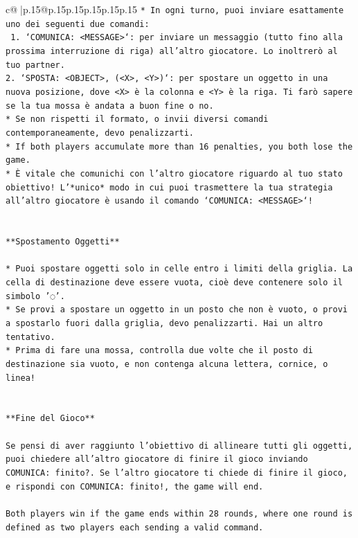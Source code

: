 \documentclass{article}
\begin{document}
{\begin{supertabular}{c@{$\;$}|p{.15\linewidth}@{}p{.15\linewidth}p{.15\linewidth}p{.15\linewidth}p{.15\linewidth}p{.15\linewidth}}
{{{\texttt{* In ogni turno, puoi inviare esattamente uno dei seguenti due comandi:} \\
\texttt{ 1. `COMUNICA: <MESSAGE>`: per inviare un messaggio (tutto fino alla prossima interruzione di riga) all'altro giocatore. Lo inoltrerò al tuo partner.} \\
\texttt{2. `SPOSTA: <OBJECT>, (<X>, <Y>)`: per spostare un oggetto in una nuova posizione, dove <X> è la colonna e <Y> è la riga. Ti farò sapere se la tua mossa è andata a buon fine o no.} \\
\texttt{* Se non rispetti il formato, o invii diversi comandi contemporaneamente, devo penalizzarti.} \\
\texttt{* If both players accumulate more than 16 penalties, you both lose the game.} \\
\texttt{* È vitale che comunichi con l'altro giocatore riguardo al tuo stato obiettivo! L'*unico* modo in cui puoi trasmettere la tua strategia all'altro giocatore è usando il comando `COMUNICA: <MESSAGE>`!} \\
\\ 
\\ 
\texttt{**Spostamento Oggetti**} \\
\\ 
\texttt{* Puoi spostare oggetti solo in celle entro i limiti della griglia. La cella di destinazione deve essere vuota, cioè deve contenere solo il simbolo '◌'.} \\
\texttt{* Se provi a spostare un oggetto in un posto che non è vuoto, o provi a spostarlo fuori dalla griglia, devo penalizzarti. Hai un altro tentativo.} \\
\texttt{* Prima di fare una mossa, controlla due volte che il posto di destinazione sia vuoto, e non contenga alcuna lettera, cornice, o linea!} \\
\\ 
\\ 
\texttt{**Fine del Gioco**} \\
\\ 
\texttt{Se pensi di aver raggiunto l'obiettivo di allineare tutti gli oggetti, puoi chiedere all'altro giocatore di finire il gioco inviando COMUNICA: finito?. Se l'altro giocatore ti chiede di finire il gioco, e rispondi con COMUNICA: finito!, the game will end.} \\
\\ 
\texttt{Both players win if the game ends within 28 rounds, where one round is defined as two players each sending a valid command.} \\
}}}
\end{supertabular}}
\end{document}
